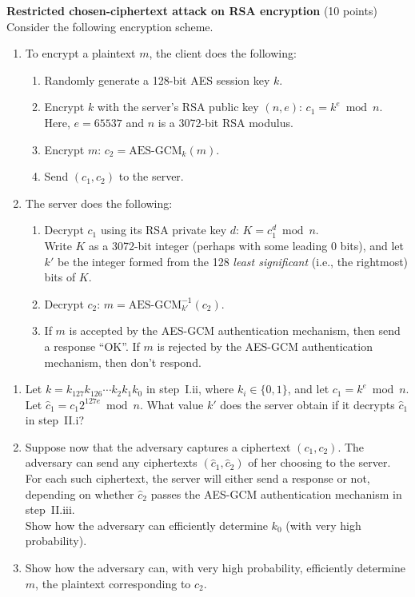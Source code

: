 \begin{problem}{\bf Restricted chosen-ciphertext attack on RSA encryption}
(10 points)\\
Consider the following encryption scheme.
\begin{enumerate}
\item[I.] To encrypt a plaintext $m$, the client does the following:
\begin{enumerate}[label=\roman*.]
\item Randomly generate a 128-bit AES session key $k$.
\item Encrypt $k$ with the server's RSA public key $(n,e)$:
$c_1 = k^e \bmod{n}$.\\ Here, $e=65537$ and $n$ is a 3072-bit RSA modulus.
\item Encrypt $m$: $c_2 = \mbox{AES-GCM}_k(m)$.
\item Send $(c_1,c_2)$ to the server.
\end{enumerate}
\item[II.] The server does the following:
\begin{enumerate}[label=\roman*.]
\item Decrypt $c_1$ using its RSA private key $d$: $K = c_1^d \bmod{n}$.\\
      Write $K$ as a 3072-bit integer (perhaps with some leading 0 bits),
      and let $k'$ be the integer formed from the 128 \emph{least significant}
      (i.e., the rightmost) bits of $K$.
\item Decrypt $c_2$: $m = \mbox{AES-GCM}^{-1}_{k'}(c_2)$.
\item If $m$ is accepted by the AES-GCM authentication mechanism, then
      send a response ``OK''. If $m$ is rejected by the AES-GCM authentication
      mechanism, then don't respond.
\end{enumerate}
\end{enumerate}

\begin{enumerate}[label=(\alph*)]
\item Let $k=k_{127}k_{126}\cdots k_2k_1k_0$ in step~I.ii,
where $k_i \in \{0,1\}$, and let $c_1 = k^e \bmod{n}$.
Let $\hat{c}_1 = c_1 2^{127e} \bmod{n}$. What value $k'$ does the server
obtain if it decrypts $\hat{c}_1$ in step~II.i?
\item Suppose now that the adversary captures a ciphertext $(c_1,c_2)$.
The adversary can send any ciphertexts $(\hat{c}_1,\hat{c}_2)$ of
her choosing to the server. For each such ciphertext, the server will
either send a response or not, depending on whether $\hat{c}_2$ passes
the AES-GCM authentication mechanism in step~II.iii.\\
Show how the adversary can efficiently determine $k_0$ (with very high
probability).
\item Show how the adversary can, with very high probability, efficiently
determine $m$, the plaintext corresponding to $c_2$.
\end{enumerate}
\end{problem}

